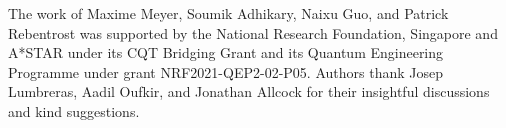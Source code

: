 
The work of Maxime Meyer, Soumik Adhikary, Naixu Guo, and Patrick Rebentrost was supported by the National
Research Foundation, Singapore and A*STAR under its CQT Bridging Grant and its Quantum
Engineering Programme under grant NRF2021-QEP2-02-P05.
Authors thank Josep Lumbreras, Aadil Oufkir, and Jonathan Allcock for their insightful discussions and kind suggestions.